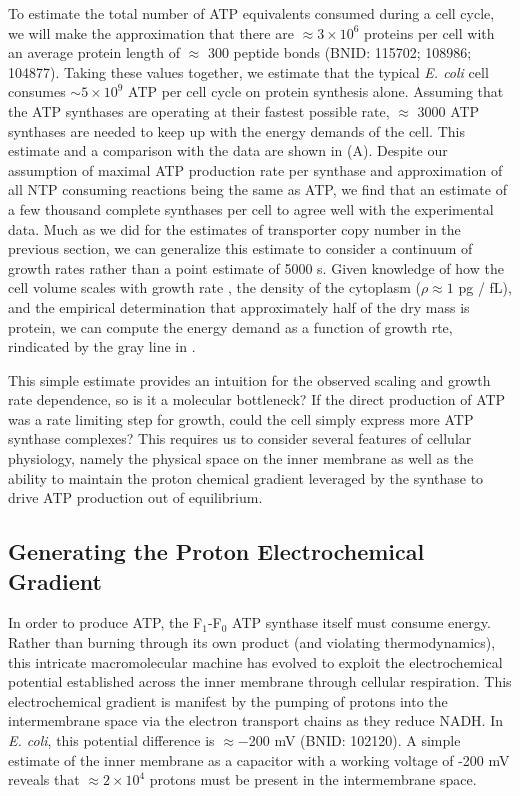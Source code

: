 To estimate the total number of ATP equivalents consumed during a cell cycle,
we will make the approximation that there are $\approx 3\times10^6$ proteins
per cell with an average protein length of $\approx$ 300 peptide bonds (BNID:
115702; 108986; 104877). Taking these values together, we estimate that the
typical \textit{E. coli} cell consumes $\sim 5 \times 10^9$ ATP per cell
cycle on protein synthesis alone. Assuming that the ATP synthases are
operating at their fastest possible rate, $\approx$ 3000 ATP synthases are
needed to keep up with the energy demands of the cell. This estimate and a
comparison with the data are shown in  (A). Despite
our assumption of maximal ATP production rate per synthase and approximation
of all NTP consuming reactions being the same as ATP, we find that an
estimate of a few thousand complete synthases per cell to agree well with the
experimental data. Much as we did for the estimates of transporter copy
number in the previous section, we can generalize this estimate to consider a
continuum of growth rates rather than a point estimate of 5000 s. Given
knowledge of how the cell volume scales with growth rate \citep{si2017}, the
density of the cytoplasm ($\rho \approx 1$ pg / fL), and the empirical
determination that approximately half of the dry mass is protein, we can
compute the energy demand as a function of growth rte, rindicated by the gray
line in .

This simple estimate provides an intuition for the observed scaling
and growth rate dependence, so is it a molecular bottleneck? If the
direct production of ATP was a rate limiting step for growth, could the cell
simply express more ATP synthase complexes? This requires us to consider
several features of cellular physiology, namely the physical space on the
inner membrane as well as the ability to maintain the proton chemical
gradient leveraged by the synthase to drive ATP production out of
equilibrium.

\subsection{Generating the Proton Electrochemical Gradient} In order to
produce ATP, the F$_1$-F$_0$ ATP synthase itself must consume energy. Rather
than burning through its own product (and violating thermodynamics), this
intricate macromolecular machine has evolved to exploit the electrochemical
potential established across the inner membrane through cellular respiration.
This electrochemical gradient is manifest by the pumping of protons into the
intermembrane space via the electron transport chains as they reduce NADH. In
\textit{E. coli}, this potential difference is $\approx -$200 mV (BNID:
102120). A simple estimate of the inner membrane as a capacitor with a
working voltage of -200 mV reveals that $\approx 2\times 10^4$ protons must
be present in the intermembrane space.


